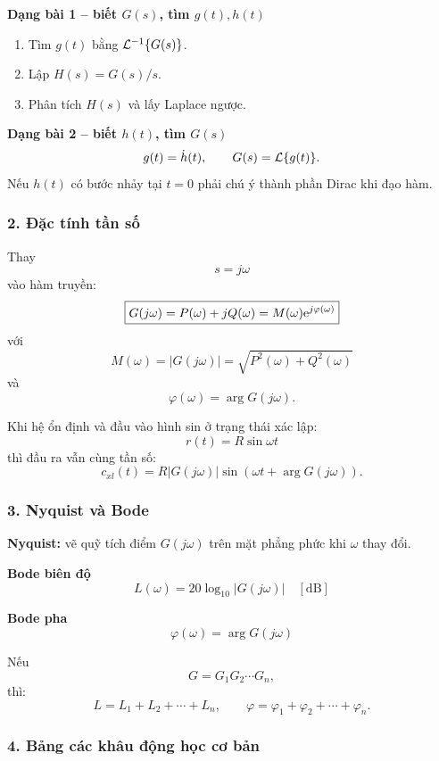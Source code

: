 \textbf{Dạng bài 1 -- biết $G(s)$, tìm $g(t),h(t)$}
\begin{enumerate}
  \item Tìm $g(t)$ bằng $\mathcal{L}^{-1}\{G(s)\}$.
  \item Lập $H(s)=G(s)/s$.
  \item Phân tích $H(s)$ và lấy Laplace ngược.
\end{enumerate}

\textbf{Dạng bài 2 -- biết $h(t)$, tìm $G(s)$}
\[
g(t)=\dot h(t),\qquad G(s)=\mathcal{L}\{g(t)\}.
\]
Nếu $h(t)$ có bước nhảy tại $t=0$ phải chú ý thành phần Dirac khi đạo hàm.

\subsubsection*{2. Đặc tính tần số}

Thay
\[
s=j\omega
\]
vào hàm truyền:
\[
\boxed{
G(j\omega)=P(\omega)+jQ(\omega)
=M(\omega)\mathrm{e}^{j\varphi(\omega)}
}
\]
với
\[
\boxed{
M(\omega)=|G(j\omega)|
=\sqrt{P^2(\omega)+Q^2(\omega)}
}
\]
và
\[
\boxed{
\varphi(\omega)=\arg G(j\omega).
}
\]

Khi hệ ổn định và đầu vào hình sin ở trạng thái xác lập:
\[
r(t)=R\sin\omega t
\]
thì đầu ra vẫn cùng tần số:
\[
\boxed{
c_{xl}(t)=R|G(j\omega)|
\sin\!\left(\omega t+\arg G(j\omega)\right).
}
\]

\subsubsection*{3. Nyquist và Bode}

\textbf{Nyquist:} vẽ quỹ tích điểm $G(j\omega)$ trên mặt phẳng phức khi $\omega$ thay đổi.

\textbf{Bode biên độ}
\[
\boxed{
L(\omega)=20\log_{10}|G(j\omega)|\quad[\mathrm{dB}]
}
\]

\textbf{Bode pha}
\[
\boxed{
\varphi(\omega)=\arg G(j\omega)
}
\]

Nếu
\[
G=G_1G_2\cdots G_n,
\]
thì:
\[
\boxed{
L=L_1+L_2+\cdots+L_n,\qquad
\varphi=\varphi_1+\varphi_2+\cdots+\varphi_n.
}
\]

\subsubsection*{4. Bảng các khâu động học cơ bản}

